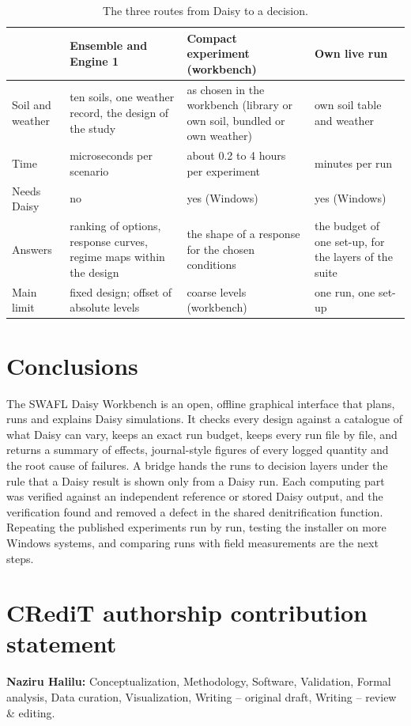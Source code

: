 \documentclass[preprint,12pt]{elsarticle}
\begin{document}
\begin{table}[!htbp]\centering\small
\caption{The three routes from Daisy to a decision.}\label{tab:routes}
\begin{tabularx}{\textwidth}{>{\raggedright\arraybackslash}p{3.0cm}XXX}
\toprule & Ensemble and Engine 1 & Compact experiment (workbench) & Own live run\\\midrule
Soil and weather & ten soils, one weather record, the design of the study & as chosen in the workbench (library or own soil, bundled or own weather) & own soil table and weather\\
Time & microseconds per scenario & about 0.2 to 4 hours per experiment & minutes per run\\
Needs Daisy & no & yes (Windows) & yes (Windows)\\
Answers & ranking of options, response curves, regime maps within the design & the shape of a response for the chosen conditions & the budget of one set-up, for the layers of the suite\\
Main limit & fixed design; offset of absolute levels & coarse levels (workbench) & one run, one set-up\\\bottomrule
\end{tabularx}
\end{table}

\section{Conclusions}
The SWAFL Daisy Workbench is an open, offline graphical interface that plans, runs and explains Daisy simulations. It checks every design against a catalogue of what Daisy can vary, keeps an exact run budget, keeps every run file by file, and returns a summary of effects, journal-style figures of every logged quantity and the root cause of failures. A bridge hands the runs to decision layers under the rule that a Daisy result is shown only from a Daisy run. Each computing part was verified against an independent reference or stored Daisy output, and the verification found and removed a defect in the shared denitrification function. Repeating the published experiments run by run, testing the installer on more Windows systems, and comparing runs with field measurements are the next steps.

\section*{CRediT authorship contribution statement}
\textbf{Naziru Halilu:} Conceptualization, Methodology, Software, Validation, Formal analysis, Data curation, Visualization, Writing -- original draft, Writing -- review \& editing.
\end{document}

